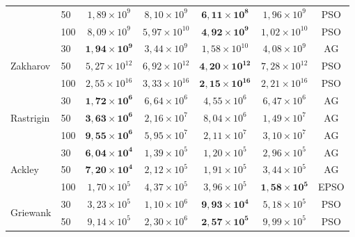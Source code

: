 \documentclass[runningheads]{llncs}
\begin{document}
\begin{table}[H]
\begin{tabular}{llccccc}
  & 50  & $1{,}89{\times}10^{9}$ & $8{,}10{\times}10^{9}$ & \cellcolor{green!20}$\mathbf{6{,}11{\times}10^{8}}$ & $1{,}96{\times}10^{9}$ & PSO \\
  & 100 & $8{,}09{\times}10^{9}$ & $5{,}97{\times}10^{10}$ & \cellcolor{green!20}$\mathbf{4{,}92{\times}10^{9}}$ & $1{,}02{\times}10^{10}$ & PSO \\
\midrule
\multirow{3}{*}{Zakharov}
  & 30  & \cellcolor{green!20}$\mathbf{1{,}94{\times}10^{9}}$ & $3{,}44{\times}10^{9}$ & $1{,}58{\times}10^{10}$ & $4{,}08{\times}10^{9}$ & AG \\
  & 50  & $5{,}27{\times}10^{12}$ & $6{,}92{\times}10^{12}$ & \cellcolor{green!20}$\mathbf{4{,}20{\times}10^{12}}$ & $7{,}28{\times}10^{12}$ & PSO \\
  & 100 & $2{,}55{\times}10^{16}$ & $3{,}33{\times}10^{16}$ & \cellcolor{green!20}$\mathbf{2{,}15{\times}10^{16}}$ & $2{,}21{\times}10^{16}$ & PSO \\
\midrule
\multirow{3}{*}{Rastrigin}
  & 30  & \cellcolor{green!20}$\mathbf{1{,}72{\times}10^{6}}$ & $6{,}64{\times}10^{6}$ & $4{,}55{\times}10^{6}$ & $6{,}47{\times}10^{6}$ & AG \\
  & 50  & \cellcolor{green!20}$\mathbf{3{,}63{\times}10^{6}}$ & $2{,}16{\times}10^{7}$ & $8{,}04{\times}10^{6}$ & $1{,}49{\times}10^{7}$ & AG \\
  & 100 & \cellcolor{green!20}$\mathbf{9{,}55{\times}10^{6}}$ & $5{,}95{\times}10^{7}$ & $2{,}11{\times}10^{7}$ & $3{,}10{\times}10^{7}$ & AG \\
\midrule
\multirow{3}{*}{Ackley}
  & 30  & \cellcolor{green!20}$\mathbf{6{,}04{\times}10^{4}}$ & $1{,}39{\times}10^{5}$ & $1{,}20{\times}10^{5}$ & $2{,}96{\times}10^{5}$ & AG \\
  & 50  & \cellcolor{green!20}$\mathbf{7{,}20{\times}10^{4}}$ & $2{,}12{\times}10^{5}$ & $1{,}91{\times}10^{5}$ & $3{,}44{\times}10^{5}$ & AG \\
  & 100 & $1{,}70{\times}10^{5}$ & $4{,}37{\times}10^{5}$ & $3{,}96{\times}10^{5}$ & \cellcolor{green!20}$\mathbf{1{,}58{\times}10^{5}}$ & EPSO \\
\midrule
\multirow{3}{*}{Griewank}
  & 30  & $3{,}23{\times}10^{5}$ & $1{,}10{\times}10^{6}$ & \cellcolor{green!20}$\mathbf{9{,}93{\times}10^{4}}$ & $5{,}18{\times}10^{5}$ & PSO \\
  & 50  & $9{,}14{\times}10^{5}$ & $2{,}30{\times}10^{6}$ & \cellcolor{green!20}$\mathbf{2{,}57{\times}10^{5}}$ & $9{,}99{\times}10^{5}$ & PSO \\

\end{tabular}
\end{table}
\end{document}
